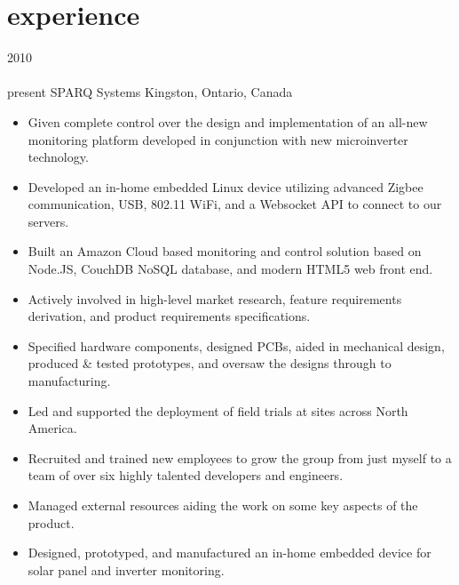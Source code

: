 
\section{experience}

\begin{entrylist}
\entry
  {2010\\\faChevronDown\\{\bodyfontit present}}
  {SPARQ Systems}
  {Kingston, Ontario, Canada}
  {
\begin{itemize}[leftmargin=12pt]
	\item Given complete control over the design and implementation of an all-new monitoring platform developed in conjunction with new microinverter technology.
  \item Developed an in-home embedded {\bodyfontit Linux} device utilizing advanced {\bodyfontit Zigbee} communication, USB, 802.11 {\bodyfontit WiFi}, and a {\bodyfontit Websocket} API to connect to our servers.
  \item Built an Amazon {\bodyfontit Cloud} based monitoring and control solution based on {\bodyfontit Node.JS}, {\bodyfontit CouchDB} NoSQL database, and modern {\bodyfontit HTML5} web front end.
	\item Actively involved in high-level market research, feature requirements derivation, and product requirements specifications.
	\item Specified hardware components, designed PCBs, aided in mechanical design, produced \& tested prototypes, and oversaw the designs through to manufacturing.
  \item Led and supported the deployment of field trials at sites across North America.
	\item Recruited and trained new employees to grow the group from just myself to a team of over six highly talented developers and engineers.
	\item Managed external resources aiding the work on some key aspects of the product.
\end{itemize}
\begin{itemize}[leftmargin=12pt]
	\item Designed, prototyped, and manufactured an in-home {\bodyfontit embedded device} for solar panel and inverter monitoring.

\end{itemize}}
\end{entrylist}
